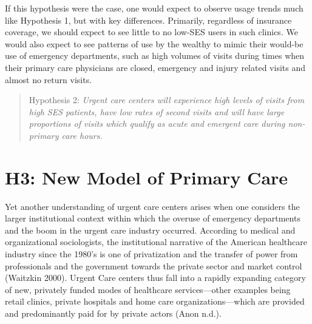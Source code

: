 \documentclass[12pt,twoside]{reedthesis}
\begin{document}
  If this hypothesis were the case, one would expect to observe usage
  trends much like Hypothesis 1, but with key differences. Primarily,
  regardless of insurance coverage, we should expect to see little to no
  low-SES users in such clinics. We would also expect to see patterns of
  use by the wealthy to mimic their would-be use of emergency departments,
  such as high volumes of visits during times when their primary care
  physicians are closed, emergency and injury related visits and almost no
  return visits.
  
  \begin{quote}
  Hypothesis 2: \emph{Urgent care centers will experience high levels of
  visits from high SES patients, have low rates of second visits and will
  have large proportions of visits which qualify as acute and emergent
  care during non-primary care hours.}
  \end{quote}
  
  \section*{H3: New Model of Primary
  Care}\label{h3-new-model-of-primary-care}
  
  Yet another understanding of urgent care centers arises when one
  considers the larger institutional context within which the overuse of
  emergency departments and the boom in the urgent care industry occurred.
  According to medical and organizational sociologists, the institutional
  narrative of the American healthcare industry since the 1980's is one of
  privatization and the transfer of power from professionals and the
  government towards the private sector and market control (Waitzkin
  2000). Urgent Care centers thus fall into a rapidly expanding category
  of new, privately funded modes of healthcare services---other examples
  being retail clinics, private hospitals and home care
  organizations---which are provided and predominantly paid for by private
  actors (Anon n.d.).
  
\end{document}
